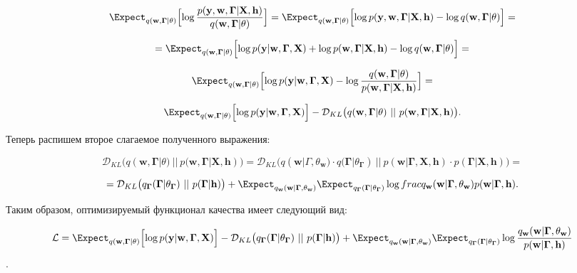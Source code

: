 \documentclass[12pt]{article}
\begin{document}
	$$\Expect_{q(\mathbf{w, \Gamma}| \mathbf{\theta})}\Bigl[\log\frac{p(\mathbf{y, w, \Gamma}| \mathbf{X, h})}{q(\mathbf{w, \Gamma}| \mathbf{\theta})}\Bigr] = \Expect_{q(\mathbf{w, \Gamma}| \mathbf{\theta})}\Bigl[\log p(\mathbf{y, w, \Gamma}| \mathbf{X, h}) - \log q(\mathbf{w, \Gamma}|\theta) \Bigr]=$$
	
	$$=\Expect_{q(\mathbf{w, \Gamma}| \mathbf{\theta})}\Bigl[\log p(\mathbf{y}| \mathbf{w, \Gamma, X}) + \log p(\mathbf{w, \Gamma}|\mathbf{X, h}) - \log q(\mathbf{w, \Gamma}|\theta) \Bigr]=$$
	
	$$\Expect_{q(\mathbf{w, \Gamma}| \mathbf{\theta})}\Bigl[\log p(\mathbf{y}| \mathbf{w, \Gamma, X})  - \log \frac{q(\mathbf{w, \Gamma}|\theta)}{p(\mathbf{w, \Gamma}|\mathbf{X, h})} \Bigr]=$$
	
	$$\Expect_{q(\mathbf{w, \Gamma}| \mathbf{\theta})}\Bigl[\log p(\mathbf{y}| \mathbf{w, \Gamma, X})\Bigr]  - \mathcal{D}_{KL}\bigl(q(\mathbf{w, \Gamma} | \theta) \ || \ p(\mathbf{w, \Gamma} | \mathbf{X, h}) \bigr).$$
	
	Теперь распишем второе слагаемое полученного выражения:
	
	$$\mathcal{D}_{KL}\bigl(q(\mathbf{w, \Gamma} | \theta) \ || \ p(\mathbf{w, \Gamma} | \mathbf{X, h}) \bigr) = \mathcal{D}_{KL}\bigl(q(\mathbf{w} | \Gamma, \theta_{\mathbf{w}}) \cdot q(\mathbf{\Gamma} |\theta_{\mathbf{\Gamma}}) \ || \ p(\mathbf{w} | \mathbf{\Gamma, X, h}) \cdot p(\mathbf{\Gamma} | \mathbf{X, h}) \bigr)=$$
	
	$$=\mathcal{D}_{KL}\bigl(q_{\mathbf{\Gamma}}(\mathbf{\Gamma}|\theta_{\mathbf{\Gamma}}) \ || \ p(\mathbf{\Gamma} | \mathbf{h}) \bigr) + \Expect_{q_{\mathbf{w}}(\mathbf{w} | \mathbf{\Gamma, \theta_{\mathbf{w}}})} \Expect_{q_{\mathbf{\Gamma}}(\mathbf{\Gamma} | \mathbf{\theta_{\mathbf{\Gamma}}})} \log\\frac{q_{\mathbf{w}}(\mathbf{w} | \mathbf{\Gamma, \theta_{\mathbf{w}}})}{p(\mathbf{w}|\mathbf{\Gamma, h})}.$$
	
	Таким образом, оптимизируемый функционал качества имеет следующий вид:
	
	$$\mathcal{L} = \Expect_{q(\mathbf{w, \Gamma}| \mathbf{\theta})}\Bigl[\log p(\mathbf{y}| \mathbf{w, \Gamma, X})\Bigr] - \mathcal{D}_{KL}\bigl(q_{\mathbf{\Gamma}}(\mathbf{\Gamma}|\theta_{\mathbf{\Gamma}}) \ || \ p(\mathbf{\Gamma} | \mathbf{h}) \bigr) + \Expect_{q_{\mathbf{w}}(\mathbf{w} | \mathbf{\Gamma, \theta_{\mathbf{w}}})} \Expect_{q_{\mathbf{\Gamma}}(\mathbf{\Gamma} | \mathbf{\theta_{\mathbf{\Gamma}}})} \log\frac{q_{\mathbf{w}}(\mathbf{w} | \mathbf{\Gamma, \theta_{\mathbf{w}}})}{p(\mathbf{w}|\mathbf{\Gamma, h})}$$.
	
\end{document}
